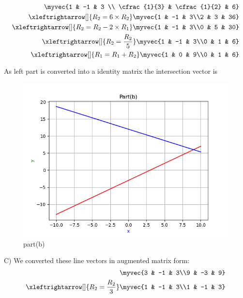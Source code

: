 \begin{enumerate}[label=\thesection.\arabic*.,ref=\thesection.\theenumi]
\begin{align*}
    \myvec{1 & -1 & 3 \\ \cfrac{1}{3} & \cfrac{1}{2} & 6}
\\ 
    \xleftrightarrow[]{R_{2}=6\times R_{2}}  \myvec{1 & -1 & 3\\2 & 3 & 36}
\\ 
    \xleftrightarrow[]{R_{2}=R_{2}-2\times R_{1}} \myvec{1 & -1 & 3\\0 & 5 & 30}
\\ 
    \xleftrightarrow[]{R_{2}=\frac{R_{2}}{5}} \myvec{1 & -1 & 3\\0 & 1 & 6}
\\ 
    \xleftrightarrow[]{R_{1}=R_{1}+R_{2}} \myvec{1 & 0 & 9\\0 & 1 & 6}
\end{align*}

As left part is converted into a identity matrix the intersection vector is \\

\renewcommand{\thefigure}{\theenumi.\arabic{figure}}
\begin{figure}[!ht]
    \centering
    \includegraphics[width=\columnwidth]{./figures/A1_partb}
\caption{part(b)}
\label{fig: part(b)}
\end{figure}

C)
We converted these line vectors in augmented matrix form:\\ 

\begin{align*}
    \myvec{3 & -1 & 3\\9 & -3 & 9}
\\
    \xleftrightarrow[]{R_{2}=\frac{R_{2}}{3}} \myvec{1 & -1 & 3\\1 & -1 & 3}
\end{align*}


\end{enumerate}
